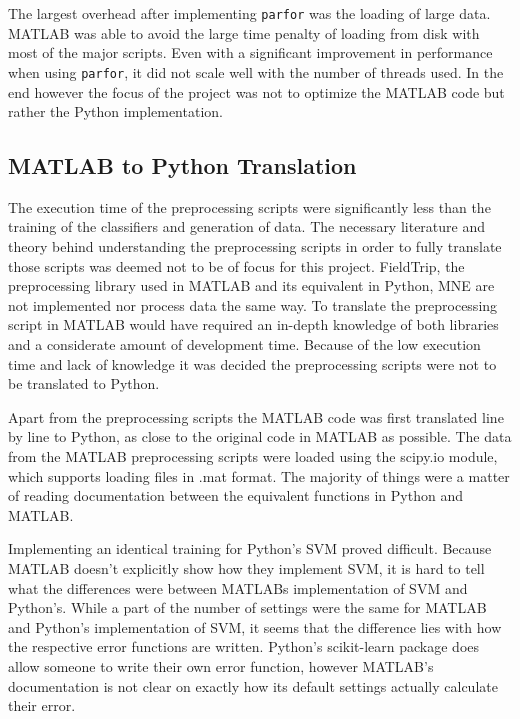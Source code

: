 \documentclass[12pt, a4paper]{article}
\begin{document}
The largest overhead after implementing \texttt{parfor} was the loading of large data. 
MATLAB was able to avoid the large time penalty of loading from disk with most of the major scripts.
Even with a significant improvement in performance when using \texttt{parfor}, it did not scale well with the number of threads used.
In the end however the focus of the project was not to optimize the MATLAB code but rather the Python implementation.


\subsection{MATLAB to Python Translation}\label{MATPYConv}

The execution time of the preprocessing scripts were significantly less than the training of the classifiers and generation of data. 
The necessary literature and theory behind understanding the preprocessing scripts in order to fully translate those scripts was deemed not to be of focus for this project.
FieldTrip, the preprocessing library used in MATLAB and its equivalent in Python, MNE are not implemented nor process data the same way.
To translate the preprocessing script in MATLAB would have required an in-depth knowledge of both libraries and a considerate amount of development time.
Because of the low execution time and lack of knowledge it was decided the preprocessing scripts were not to be translated to Python.

Apart from the preprocessing scripts the MATLAB code was first translated line by line to Python, as close to the original code in MATLAB as possible.
The data from the MATLAB preprocessing scripts were loaded using the scipy.io module, which supports loading files in .mat format.
The majority of things were a matter of reading documentation between the equivalent functions in Python and MATLAB.

Implementing an identical training for Python's SVM proved difficult.
Because MATLAB doesn't explicitly show how they implement SVM, it is hard to tell what the differences were between MATLABs implementation of SVM and Python's.
While a part of the number of settings were the same for MATLAB and Python's implementation of SVM, it seems that the difference lies with how the respective error functions are written.
Python's scikit-learn package does allow someone to write their own error function, however MATLAB's documentation is not clear on exactly how its default settings actually calculate their error. %
\end{document}
